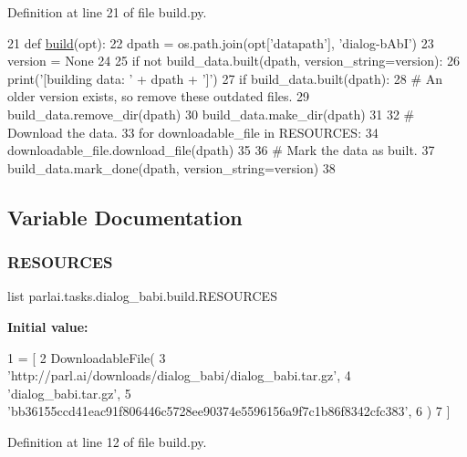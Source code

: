 Definition at line 21 of file build.\+py.


\begin{DoxyCode}
21 \textcolor{keyword}{def }\hyperlink{namespacedialog__babi__feedback_1_1build_a7a9d289f7493a5ded13c4b7f071b6184}{build}(opt):
22     dpath = os.path.join(opt[\textcolor{stringliteral}{'datapath'}], \textcolor{stringliteral}{'dialog-bAbI'})
23     version = \textcolor{keywordtype}{None}
24 
25     \textcolor{keywordflow}{if} \textcolor{keywordflow}{not} build\_data.built(dpath, version\_string=version):
26         print(\textcolor{stringliteral}{'[building data: '} + dpath + \textcolor{stringliteral}{']'})
27         \textcolor{keywordflow}{if} build\_data.built(dpath):
28             \textcolor{comment}{# An older version exists, so remove these outdated files.}
29             build\_data.remove\_dir(dpath)
30         build\_data.make\_dir(dpath)
31 
32         \textcolor{comment}{# Download the data.}
33         \textcolor{keywordflow}{for} downloadable\_file \textcolor{keywordflow}{in} RESOURCES:
34             downloadable\_file.download\_file(dpath)
35 
36         \textcolor{comment}{# Mark the data as built.}
37         build\_data.mark\_done(dpath, version\_string=version)
38 \end{DoxyCode}


\subsection{Variable Documentation}
\mbox{\label{namespaceparlai_1_1tasks_1_1dialog__babi_1_1build_a56f87771d583e88a5704c337bb2f569b}} 
\subsubsection{\texorpdfstring{R\+E\+S\+O\+U\+R\+C\+ES}{RESOURCES}}
{\footnotesize\ttfamily list parlai.\+tasks.\+dialog\+\_\+babi.\+build.\+R\+E\+S\+O\+U\+R\+C\+ES}

{\bfseries Initial value\+:}
\begin{DoxyCode}
1 =  [
2     DownloadableFile(
3         \textcolor{stringliteral}{'http://parl.ai/downloads/dialog\_babi/dialog\_babi.tar.gz'},
4         \textcolor{stringliteral}{'dialog\_babi.tar.gz'},
5         \textcolor{stringliteral}{'bb36155ccd41eac91f806446c5728ee90374e5596156a9f7c1b86f8342cfc383'},
6     )
7 ]
\end{DoxyCode}


Definition at line 12 of file build.\+py.

